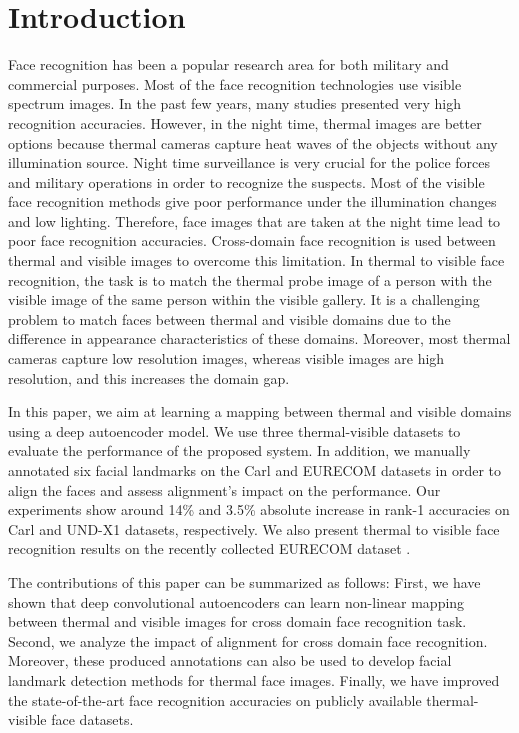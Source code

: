 \documentclass[conference]{IEEEtran}
\begin{document}
\section{Introduction}
Face recognition has been a popular research area for both military and commercial purposes. Most of the face recognition technologies use visible spectrum images. In the past few years, many studies presented very high recognition accuracies. However, in the night time, thermal images are better options because thermal cameras capture heat waves of the objects without any illumination source. Night time surveillance is very crucial for the police forces and military operations in order to recognize the suspects. Most of the visible face recognition methods give poor performance under the illumination changes and low lighting. Therefore, face images that are taken at the night time lead to poor face recognition accuracies. Cross-domain face recognition is used between thermal and visible images to overcome this limitation. In thermal to visible face recognition, the task is to match the thermal probe image of a person with the visible image of the same person within the visible gallery. It is a challenging problem to match faces between thermal and visible domains due to the difference in appearance characteristics of these domains. Moreover, most thermal cameras capture low resolution images, whereas visible images are high resolution, and this increases the domain gap. 



In this paper, we aim at learning a mapping between thermal and visible domains using a deep autoencoder model. We use three thermal-visible datasets to evaluate the performance of the proposed system. In addition, we manually annotated six facial landmarks on the Carl and EURECOM datasets in order to align the faces and assess alignment's impact on the performance. Our experiments show around 14\% and 3.5\%  absolute increase in rank-1 accuracies on Carl \cite{carl2010,carl2013} and UND-X1 \cite{notredame,notredame2} datasets, respectively. We also present thermal to visible face recognition results on the recently collected EURECOM dataset \cite{eurecom}.  

The contributions of this paper can be summarized as follows: First, we have shown that deep convolutional autoencoders can learn non-linear mapping between thermal and visible images for cross domain face recognition task. Second, we analyze the impact of alignment for cross domain face recognition. Moreover, these produced annotations can also be used to develop facial landmark detection methods for thermal face images. Finally, we have improved the state-of-the-art face recognition accuracies on publicly available thermal-visible face datasets. 
\end{document}
